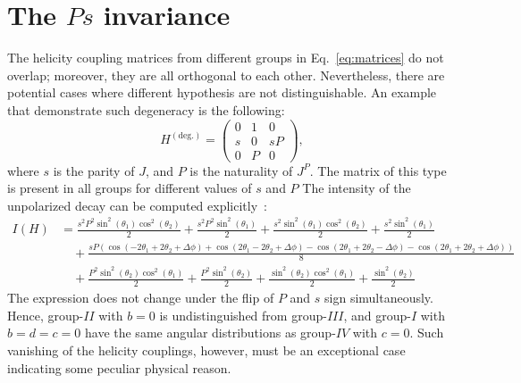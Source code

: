 \documentclass[prd,preprintnumbers,floatfix,
nofootinbib,superscriptaddress]{revtex4}
\newcommand{\I}{\ensuremath{I}}
\newcommand{\II}{\ensuremath{{I\!I}}}
\newcommand{\III}{\ensuremath{{I\!I\!I}}}
\newcommand{\IV}{\ensuremath{{I\!V}}}
\begin{document}
\section{The $P s$ invariance} \label{sec:Ps.invariance}
The helicity coupling matrices from different groups in Eq.~\eqref{eq:matrices} do not overlap;
moreover, they are all orthogonal to each other.
Nevertheless, there are potential cases where different hypothesis are not distinguishable.
An example that demonstrate such degeneracy is the following:
\begin{equation}
  H^{(\text{deg.})} = \begin{pmatrix}
    0 &1 &0 \\
    s & 0 &sP \\
    0 &P &0
  \end{pmatrix},
\end{equation}
where $s$ is the parity of $J$, and $P$ is the naturality of $J^P$.
The matrix of this type is present in all groups for different values of $s$ and $P$
The intensity of the unpolarized decay can be computed explicitly~\cite{SymPy}:
\begin{align}
  I(H) &= \frac{s^{2} P^{2} \sin^{2}{\left (\theta_{1} \right )} \cos^{2}{\left (\theta_{2} \right )}}{2} + \frac{s^{2} P^{2} \sin^{2}{\left (\theta_{1} \right )}}{2} + \frac{s^{2} \sin^{2}{\left (\theta_{1} \right )} \cos^{2}{\left (\theta_{2} \right )}}{2} + \frac{s^{2} \sin^{2}{\left (\theta_{1} \right )}}{2} \\ \nonumber
   &\quad + \frac{s P \left(\cos{\left (- 2 \theta_{1} + 2 \theta_{2} + \Delta\phi \right )} + \cos{\left (2 \theta_{1} - 2 \theta_{2} + \Delta\phi \right )} - \cos{\left (2 \theta_{1} + 2 \theta_{2} - \Delta\phi \right )} - \cos{\left (2 \theta_{1} + 2 \theta_{2} + \Delta\phi \right )}\right)}{8}\\ \nonumber
   &\quad+\frac{P^{2} \sin^{2}{\left (\theta_{2} \right )} \cos^{2}{\left (\theta_{1} \right )}}{2} + \frac{P^{2} \sin^{2}{\left (\theta_{2} \right )}}{2} + \frac{\sin^{2}{\left (\theta_{2} \right )} \cos^{2}{\left (\theta_{1} \right )}}{2} + \frac{\sin^{2}{\left (\theta_{2} \right )}}{2}
\end{align}
The expression does not change under the flip of $P$ and $s$ sign simultaneously.
Hence, group-$\II$ with $b=0$ is undistinguished from group-$\III$,
and group-$\I$ with $b=d=c=0$ have the same angular distributions as group-$\IV$ with $c=0$.
Such vanishing of the helicity couplings, however, must be an exceptional case indicating some peculiar physical reason.


\end{document}
